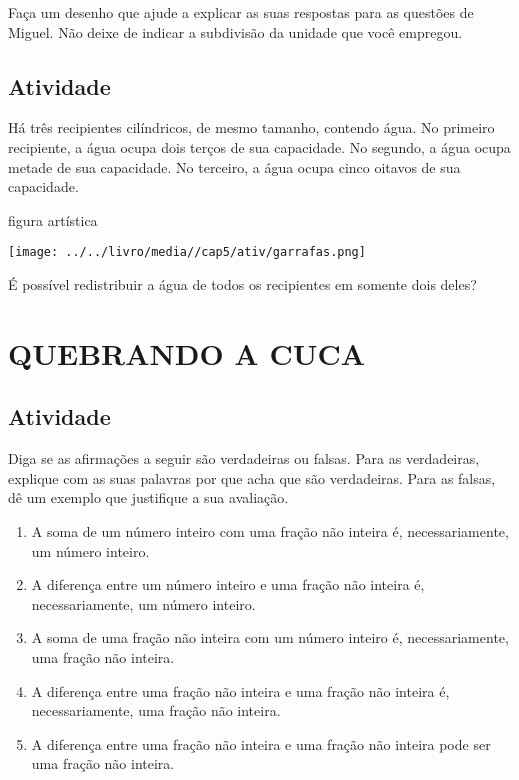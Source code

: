 Faça um desenho que ajude a explicar as suas respostas para as questões de Miguel. Não deixe de indicar a subdivisão da unidade que você empregou.

\subsection{Atividade}

Há três recipientes cilíndricos, de mesmo tamanho, contendo água. No primeiro recipiente, a água ocupa dois terços de sua capacidade. No segundo, a água ocupa metade de sua capacidade. No terceiro, a água ocupa cinco oitavos de sua capacidade.  
\begin{imagem*}[breakable]{}{}  
  figura artística  
  
    \texttt{[image: ../../livro/media//cap5/ativ/garrafas.png]}  
\end{imagem*}

É possível redistribuir a água de todos os recipientes em somente dois deles?

\section{QUEBRANDO A CUCA }

\subsection{Atividade}

Diga se as afirmações a seguir são verdadeiras ou falsas. Para as verdadeiras, explique com as suas palavras por que acha que são verdadeiras. Para as falsas, dê um exemplo que justifique a sua avaliação.
\begin{enumerate} [\quad a)] %
  \item     A soma de um número inteiro com uma fração não inteira é, necessariamente, um número inteiro.
  \item     A diferença entre um número inteiro e uma fração não inteira é, necessariamente, um número inteiro.
  \item     A soma de uma fração não inteira com um número inteiro é, necessariamente, uma fração não inteira.
  \item     A diferença entre uma fração não inteira e uma fração não inteira é, necessariamente, uma fração não inteira.
  \item     A diferença entre uma fração não inteira e uma fração não inteira pode ser uma fração não inteira.
\end{enumerate} %

